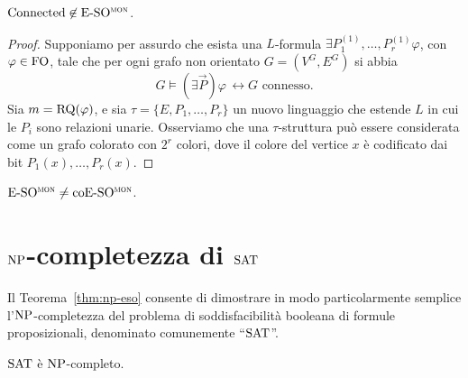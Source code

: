 \begin{lemma}
  
\end{lemma}


\begin{lemma}
  $\operatorname{Connected} \not\in \operatorname{E-SO^{\normalfont\textsc{mon}}}$.
\end{lemma}

\begin{proof}
  Supponiamo per assurdo che esista una $L$-formula $\exists P_1^{(1)},\ldots,P_r^{(1)} \varphi$, con $\varphi\in \operatorname{FO}$, tale che per ogni grafo non orientato $G=(V^G, E^G)$ si abbia
  \[ G \models (\exists \vec{P}) \varphi \, \leftrightarrow G \text{ connesso}. \]
  Sia $m=\operatorname{RQ}(\varphi)$, e sia $\tau = \{E,P_1,\ldots,P_r\}$ un nuovo linguaggio che estende $L$ in cui le $P_i$ sono relazioni unarie.
  Osserviamo che una $\tau$-struttura può essere considerata come un grafo colorato con $2^r$ colori, dove il colore del vertice $x$ è codificato dai bit $P_1(x),\ldots,P_r(x)$.
  
  
\end{proof}



\begin{teorema}
  $\operatorname{E-SO^{\normalfont\textsc{mon}}} \neq \operatorname{coE-SO^{\normalfont\textsc{mon}}}$.
\end{teorema}




\section{\texorpdfstring{$\operatorname{NP}$}{NP}-completezza di \texorpdfstring{$\operatorname{SAT}$}{SAT}}

Il Teorema~\ref{thm:np-eso} consente di dimostrare in modo particolarmente semplice l'$\operatorname{NP}$-com\-ple\-tez\-za del problema di soddisfacibilità booleana di formule proposizionali, denominato comunemente ``$\operatorname{SAT}$''.

\begin{teorema}
  $\operatorname{SAT}$ è $\operatorname{NP}$-completo.
\end{teorema}

